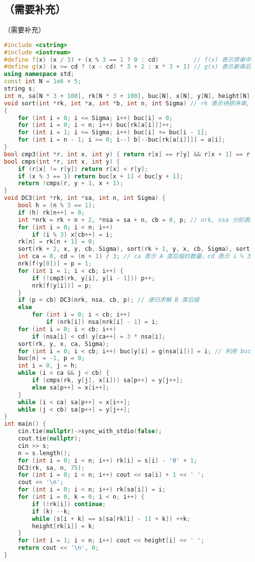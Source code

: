 \documentclass[9pt, a4paper, oneside]{book}
\begin{document}
\subsection{（需要补充）}
（需要补充）
\begin{lstlisting}[language={C++}]
#include <cstring>
#include <iostream>
#define f(x) (x / 3) + (x % 3 == 1 ? 0 : cd)          // f(x) 表示原串中后缀 x 在新串中的位置
#define g(x) (x >= cd ? (x - cd) * 3 + 2 : x * 3 + 1) // g(x) 表示新串后缀 x  在原串中的位置
using namespace std;
const int N = 1e6 + 5;
string s;
int n, sa[N * 3 + 100], rk[N * 3 + 100], buc[N], x[N], y[N], height[N];
void sort(int *rk, int *a, int *b, int n, int Sigma) // rk 表示待排序串, a 表示指标集, b 表示排序后的指标顺序
{
    for (int i = 0; i <= Sigma; i++) buc[i] = 0;
    for (int i = 0; i < n; i++) buc[rk[a[i]]]++;
    for (int i = 1; i <= Sigma; i++) buc[i] += buc[i - 1];
    for (int i = n - 1; i >= 0; i--) b[--buc[rk[a[i]]]] = a[i];
}
bool cmp3(int *r, int x, int y) { return r[x] == r[y] && r[x + 1] == r[y + 1] && r[x + 2] == r[y + 2]; }
bool cmps(int *r, int x, int y) {
    if (r[x] != r[y]) return r[x] < r[y];
    if (x % 3 == 1) return buc[x + 1] < buc[y + 1];
    return !cmps(r, y + 1, x + 1);
}
void DC3(int *rk, int *sa, int n, int Sigma) {
    bool h = (n % 3 == 1);
    if (h) rk[n++] = 0;
    int *nrk = rk + n + 2, *nsa = sa + n, cb = 0, p; // nrk, nsa 分别表示新的 rk 和 sa, cb 表示 B 类后缀的数量
    for (int i = 0; i < n; i++)
        if (i % 3) x[cb++] = i;
    rk[n] = rk[n + 1] = 0;
    sort(rk + 2, x, y, cb, Sigma), sort(rk + 1, y, x, cb, Sigma), sort(rk, x, y, cb, Sigma); // 指标顺序存在了 y 中
    int ca = 0, cd = (n + 1) / 3; // ca 表示 A 类后缀的数量，cd 表示 i % 3 = 1 的后缀的数量
    nrk[f(y[0])] = p = 1;
    for (int i = 1; i < cb; i++) {
        if (!cmp3(rk, y[i], y[i - 1])) p++;
        nrk[f(y[i])] = p;
    }
    if (p < cb) DC3(nrk, nsa, cb, p); // 递归求解 B 类后缀
    else
        for (int i = 0; i < cb; i++)
            if (nrk[i]) nsa[nrk[i] - 1] = i;
    for (int i = 0; i < cb; i++)
        if (nsa[i] < cd) y[ca++] = 3 * nsa[i];
    sort(rk, y, x, ca, Sigma);
    for (int i = 0; i < cb; i++) buc[y[i] = g(nsa[i])] = i; // 利用 buc 存 B 类后缀的排名
    buc[n] = -1, p = 0;
    int i = 0, j = h;
    while (i < ca && j < cb) {
        if (cmps(rk, y[j], x[i])) sa[p++] = y[j++];
        else sa[p++] = x[i++];
    }
    while (i < ca) sa[p++] = x[i++];
    while (j < cb) sa[p++] = y[j++];
}
int main() {
    cin.tie(nullptr)->sync_with_stdio(false);
    cout.tie(nullptr);
    cin >> s;
    n = s.length();
    for (int i = 0; i < n; i++) rk[i] = s[i] - '0' + 1;
    DC3(rk, sa, n, 75);
    for (int i = 0; i < n; i++) cout << sa[i] + 1 << ' ';
    cout << '\n';
    for (int i = 0; i < n; i++) rk[sa[i]] = i;
    for (int i = 0, k = 0; i < n; i++) {
        if (!rk[i]) continue;
        if (k) --k;
        while (s[i + k] == s[sa[rk[i] - 1] + k]) ++k;
        height[rk[i]] = k;
    }
    for (int i = 1; i < n; i++) cout << height[i] << ' ';
    return cout << '\n', 0;
}\end{lstlisting}
\end{document}
